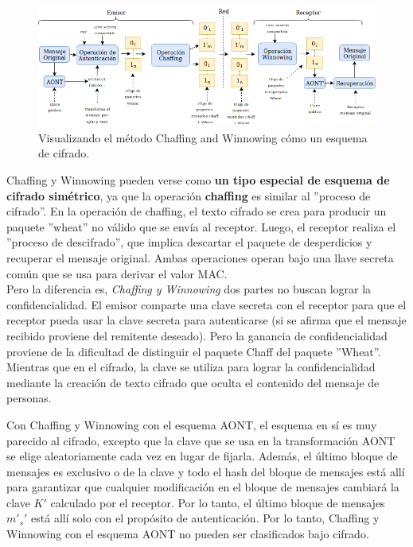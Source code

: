 \documentclass[12pt, a4paper, titlepage]{article}
\begin{document}
        \begin{figure}[H]
			\begin{center}	                  \includegraphics[width=14cm]{./imagenes/chaffVsCrypto.png}
				\caption{Visualizando el método Chaffing and Winnowing cómo un esquema de cifrado.}
			\end{center}
		\end{figure}
        
        Chaffing y Winnowing pueden verse como \textbf{un tipo especial de esquema de cifrado simétrico}, ya que la operación \textbf{chaffing} es similar al ''proceso de cifrado''. En la operación de chaffing, el texto cifrado se crea para producir un paquete ''wheat'' no válido que se envía al receptor. Luego, el receptor realiza el ''proceso de descifrado'', que implica descartar el paquete de desperdicios y recuperar el mensaje original. Ambas operaciones operan bajo una llave secreta común que se usa para derivar el valor MAC.\\
        
        Pero la diferencia es, \textit{Chaffing y Winnowing} dos partes no buscan lograr la confidencialidad. El emisor comparte una clave secreta con el receptor para que el receptor pueda usar la clave secreta para autenticarse (si se afirma que el mensaje recibido proviene del remitente deseado). Pero la ganancia de confidencialidad proviene de la dificultad de distinguir el paquete Chaff del paquete ''Wheat''. Mientras que en el cifrado, la clave se utiliza para lograr la confidencialidad mediante la creación de texto cifrado que oculta el contenido del mensaje de personas.
        
        Con Chaffing y Winnowing con el esquema AONT, el esquema en sí es muy parecido al cifrado, excepto que la clave que se usa en la transformación AONT se elige aleatoriamente cada vez en lugar de fijarla. Además, el último bloque de mensajes es exclusivo o de la clave y todo el hash del bloque de mensajes está allí para garantizar que cualquier modificación en el bloque de mensajes cambiará la clave $K'$ calculado por el receptor. Por lo tanto, el último bloque de mensajes ${m'}_s'$ está allí solo con el propósito de autenticación. Por lo tanto, Chaffing y Winnowing con el esquema AONT no pueden ser clasificados bajo cifrado.\\
        
\end{document}

